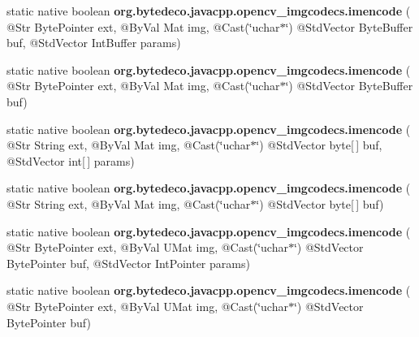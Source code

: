 \begin{DoxyCompactItemize}
\item 
\mbox{\label{group__imgcodecs_ga49a3cb4c9c7ae884ae3942a77b02a81d}} 
static native boolean {\bfseries org.\+bytedeco.\+javacpp.\+opencv\+\_\+imgcodecs.\+imencode} ( @Str Byte\+Pointer ext, @By\+Val Mat img, @Cast(\char`\"{}uchar$\ast$\char`\"{}) @Std\+Vector Byte\+Buffer buf, @Std\+Vector Int\+Buffer params)
\item 
\mbox{\label{group__imgcodecs_gab60c5579a8260f108163fbdfb8e56434}} 
static native boolean {\bfseries org.\+bytedeco.\+javacpp.\+opencv\+\_\+imgcodecs.\+imencode} ( @Str Byte\+Pointer ext, @By\+Val Mat img, @Cast(\char`\"{}uchar$\ast$\char`\"{}) @Std\+Vector Byte\+Buffer buf)
\item 
\mbox{\label{group__imgcodecs_ga1d954d7870f98f610fb026ce61f71205}} 
static native boolean {\bfseries org.\+bytedeco.\+javacpp.\+opencv\+\_\+imgcodecs.\+imencode} ( @Str String ext, @By\+Val Mat img, @Cast(\char`\"{}uchar$\ast$\char`\"{}) @Std\+Vector byte\mbox{[}$\,$\mbox{]} buf, @Std\+Vector int\mbox{[}$\,$\mbox{]} params)
\item 
\mbox{\label{group__imgcodecs_ga4cea0c4ef011701a5d4884a366479ebb}} 
static native boolean {\bfseries org.\+bytedeco.\+javacpp.\+opencv\+\_\+imgcodecs.\+imencode} ( @Str String ext, @By\+Val Mat img, @Cast(\char`\"{}uchar$\ast$\char`\"{}) @Std\+Vector byte\mbox{[}$\,$\mbox{]} buf)
\item 
\mbox{\label{group__imgcodecs_gab0c5225b80060296344b74ed54fa0c12}} 
static native boolean {\bfseries org.\+bytedeco.\+javacpp.\+opencv\+\_\+imgcodecs.\+imencode} ( @Str Byte\+Pointer ext, @By\+Val U\+Mat img, @Cast(\char`\"{}uchar$\ast$\char`\"{}) @Std\+Vector Byte\+Pointer buf, @Std\+Vector Int\+Pointer params)
\item 
\mbox{\label{group__imgcodecs_gab21cd321c7e2cfacac8d7c3f48cbd6ae}} 
static native boolean {\bfseries org.\+bytedeco.\+javacpp.\+opencv\+\_\+imgcodecs.\+imencode} ( @Str Byte\+Pointer ext, @By\+Val U\+Mat img, @Cast(\char`\"{}uchar$\ast$\char`\"{}) @Std\+Vector Byte\+Pointer buf)
\item 
\mbox{\label{group__imgcodecs_ga12c2efa4af6ca0bb754e47d57fab4adc}} 

\end{DoxyCompactItemize}
